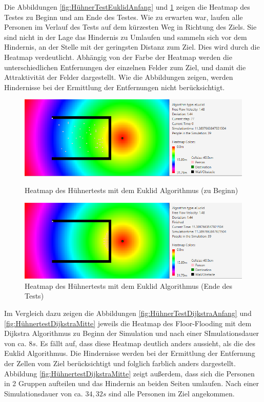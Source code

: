 Die Abbildungen \ref{fig:HühnerTestEuklidAnfang} und \ref{fig:HühnertestEuklidEnde} zeigen die Heatmap des Testes zu Beginn und am Ende des Testes. Wie zu erwarten war, laufen alle Personen im Verlauf des Tests auf dem kürzesten Weg in Richtung des Ziels. Sie sind nicht in der Lage das Hindernis zu Umlaufen und sammeln sich vor dem Hindernis, an der Stelle mit der geringsten Distanz zum Ziel. Dies wird durch die Heatmap verdeutlicht. Abhängig von der Farbe der Heatmap werden die unterschiedlichen Entfernungen der einzelnen Felder zum Ziel, und damit die Attraktivität der Felder dargestellt. Wie die Abbildungen zeigen, werden Hindernisse bei der Ermittlung der Entfernungen nicht berücksichtigt.
 
\begin{figure}[!htb]
	\centering
	\begin{minipage}{.5\textwidth}
		\centering
		\includegraphics[width=\textwidth]{abbildungen/ChickenTest1BeginEuclid.png}
		\caption{Heatmap des Hühnertests mit dem Euklid Algorithmus (zu Beginn)}
		\label{fig:HühnerTestEuklidAnfang}
	\end{minipage}%
	\begin{minipage}{0.5\textwidth}
		\centering
		\includegraphics[width=\textwidth]{abbildungen/ChickenTest1EndEuclid.png}
		\caption{Heatmap des Hühnertests mit dem Euklid Algorithmus (Ende des Tests)}
		\label{fig:HühnertestEuklidEnde}
	\end{minipage}
\end{figure}

Im Vergleich dazu zeigen die Abbildungen \ref{fig:HühnerTestDijkstraAnfang} und \ref{fig:HühnertestDijkstraMitte} jeweils die Heatmap des Floor-Flooding mit dem Dijkstra Algorithmus zu Beginn der Simulation und nach einer SImulationsdauer von ca. $8s$. Es fällt auf, dass diese Heatmap deutlich anders aussieht, als die des Euklid Algorithmus. Die Hindernisse werden bei der Ermittlung der Entfernung der Zellen vom Ziel berücksichtigt und folglich farblich anders dargestellt. Abbildung \ref{fig:HühnertestDijkstraMitte} zeigt außerdem, dass sich die Personen in 2 Gruppen aufteilen und das Hindernis an beiden Seiten umlaufen. Nach einer Simulationsdauer von ca. $34,32s$ sind alle Personen im Ziel angekommen.

